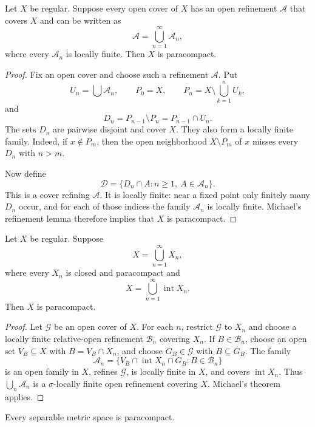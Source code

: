 \begin{thm}
Let $X$ be regular. Suppose every open cover of $X$ has an open refinement
$\mathcal{A}$ that covers $X$ and can be written as
\[
\mathcal{A}=\bigcup_{n=1}^{\infty}\mathcal{A}_n,
\]
where every $\mathcal{A}_n$ is locally finite. Then $X$ is paracompact.
\end{thm}

\begin{proof}
Fix an open cover and choose such a refinement $\mathcal{A}$. Put
\[
U_n=\bigcup\mathcal{A}_n,
\qquad
P_0=X,
\qquad
P_n=X\setminus\bigcup_{k=1}^nU_k,
\]
and
\[
D_n=P_{n-1}\setminus P_n=P_{n-1}\cap U_n.
\]
The sets $D_n$ are pairwise disjoint and cover $X$. They also form a locally
finite family. Indeed, if $x\notin P_m$, then the open neighborhood
$X\setminus P_m$ of $x$ misses every $D_n$ with $n>m$.

Now define
\[
\mathcal{D}
=
\{D_n\cap A:n\geq1,\ A\in\mathcal{A}_n\}.
\]
This is a cover refining $\mathcal{A}$. It is locally finite: near a fixed
point only finitely many $D_n$ occur, and for each of those indices the family
$\mathcal{A}_n$ is locally finite. Michael's refinement lemma therefore
implies that $X$ is paracompact.
\end{proof}

\begin{cor}
Let $X$ be regular. Suppose
\[
X=\bigcup_{n=1}^{\infty}X_n,
\]
where every $X_n$ is closed and paracompact and
\[
X=\bigcup_{n=1}^{\infty}\operatorname{int}X_n.
\]
Then $X$ is paracompact.
\end{cor}

\begin{proof}
Let $\mathcal{G}$ be an open cover of $X$. For each $n$, restrict
$\mathcal{G}$ to $X_n$ and choose a locally finite relative-open refinement
$\mathcal{B}_n$ covering $X_n$. If $B\in\mathcal{B}_n$, choose an open set
$V_B\subseteq X$ with $B=V_B\cap X_n$, and choose $G_B\in\mathcal{G}$ with
$B\subseteq G_B$. The family
\[
\mathcal{A}_n
=
\{V_B\cap\operatorname{int}X_n\cap G_B:B\in\mathcal{B}_n\}
\]
is an open family in $X$, refines $\mathcal{G}$, is locally finite in $X$,
and covers $\operatorname{int}X_n$. Thus
$\bigcup_n\mathcal{A}_n$ is a $\sigma$-locally finite open refinement covering
$X$. Michael's theorem applies.
\end{proof}

\begin{cor}
Every separable metric space is paracompact.
\end{cor}

